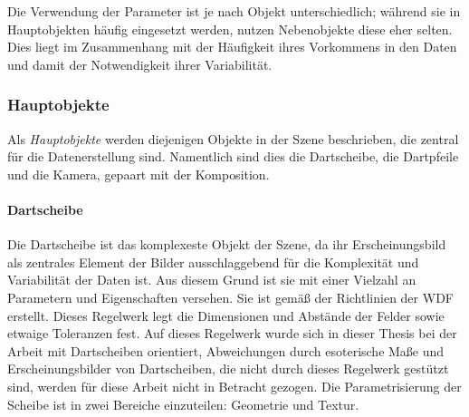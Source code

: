 \begin{center}
    \label{fig:age}
\end{center}

Die Verwendung der Parameter ist je nach Objekt unterschiedlich; während sie in Hauptobjekten häufig eingesetzt werden, nutzen Nebenobjekte diese eher selten. Dies liegt im Zusammenhang mit der Häufigkeit ihres Vorkommens in den Daten und damit der Notwendigkeit ihrer Variabilität.


\subsubsection{Hauptobjekte}
\label{sec:impl:daten:blender:hauptobjekte}

Als \textit{Hauptobjekte} werden diejenigen Objekte in der Szene beschrieben, die zentral für die Datenerstellung sind. Namentlich sind dies die Dartscheibe, die Dartpfeile und die Kamera, gepaart mit der Komposition.

\paragraph{Dartscheibe}
\label{sec:impl:daten:blender:hauptobjekte:dartscheibe}

Die Dartscheibe ist das komplexeste Objekt der Szene, da ihr Erscheinungsbild als zentrales Element der Bilder ausschlaggebend für die Komplexität und Variabilität der Daten ist. Aus diesem Grund ist sie mit einer Vielzahl an Parametern und Eigenschaften versehen. Sie ist gemäß der Richtlinien  der \ac{WDF} \cite{wdf-rules} erstellt. Dieses Regelwerk legt die Dimensionen und Abstände der Felder sowie etwaige Toleranzen fest. Auf dieses Regelwerk wurde sich in dieser Thesis bei der Arbeit mit Dartscheiben orientiert, Abweichungen durch esoterische Maße und Erscheinungsbilder von Dartscheiben, die nicht durch dieses Regelwerk gestützt sind, werden für diese Arbeit nicht in Betracht gezogen. Die Parametrisierung der Scheibe ist in zwei Bereiche einzuteilen: Geometrie und Textur.

